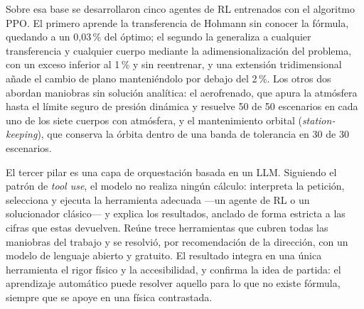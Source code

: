 \begin{resumen}
Sobre esa base se desarrollaron cinco agentes de RL entrenados con el algoritmo \acrfull{PPO}. El primero aprende la transferencia de Hohmann sin conocer la fórmula, quedando a un 0,03\,\% del óptimo; el segundo la generaliza a cualquier transferencia y cualquier cuerpo mediante la adimensionalización del problema, con un exceso inferior al 1\,\% y sin reentrenar, y una extensión tridimensional añade el cambio de plano manteniéndolo por debajo del 2\,\%. Los otros dos abordan maniobras sin solución analítica: el aerofrenado, que apura la atmósfera hasta el límite seguro de presión dinámica y resuelve 50 de 50 escenarios en cada uno de los siete cuerpos con atmósfera, y el mantenimiento orbital (\textit{station-keeping}), que conserva la órbita dentro de una banda de tolerancia en 30 de 30 escenarios.

El tercer pilar es una capa de orquestación basada en un LLM. Siguiendo el patrón de \textit{tool use}, el modelo no realiza ningún cálculo: interpreta la petición, selecciona y ejecuta la herramienta adecuada ---un agente de RL o un solucionador clásico--- y explica los resultados, anclado de forma estricta a las cifras que estas devuelven. Reúne trece herramientas que cubren todas las maniobras del trabajo y se resolvió, por recomendación de la dirección, con un modelo de lenguaje abierto y gratuito. El resultado integra en una única herramienta el rigor físico y la accesibilidad, y confirma la idea de partida: el aprendizaje automático puede resolver aquello para lo que no existe fórmula, siempre que se apoye en una física contrastada.

\end{resumen}

